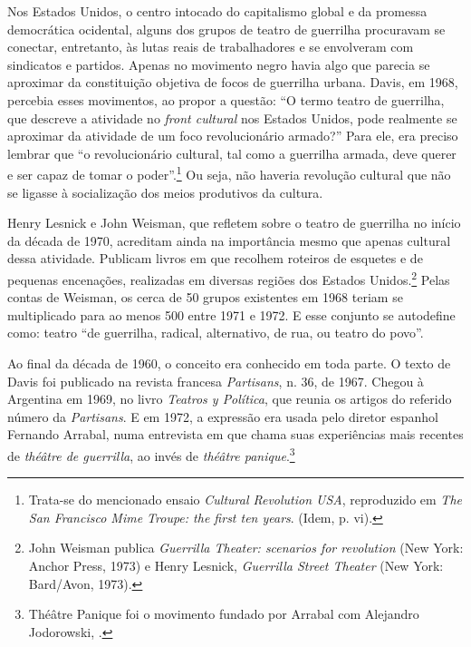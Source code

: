 Nos Estados Unidos, o centro intocado do capitalismo global e da
promessa democrática ocidental, alguns dos grupos de teatro de guerrilha
procuravam se conectar, entretanto, às lutas reais de trabalhadores e se
envolveram com sindicatos e partidos. Apenas no movimento negro havia
algo que parecia se aproximar da constituição objetiva de focos de
guerrilha urbana. Davis, em 1968, percebia esses movimentos, ao propor a
questão: “O termo teatro de guerrilha, que descreve a atividade no
\textit{front cultural} nos Estados Unidos, pode realmente se aproximar da
atividade de um foco revolucionário armado?” Para ele, era preciso
lembrar que “o revolucionário cultural, tal como a guerrilha armada,
deve querer e ser capaz de tomar o poder”.\footnote{Trata-se do
  mencionado ensaio \textit{Cultural Revolution USA}, reproduzido em
  \textit{The San Francisco Mime Troupe: the first ten years}. (Idem, p.
  vi).} Ou seja, não haveria revolução cultural que não se ligasse à
socialização dos meios produtivos da cultura.

Henry Lesnick e John Weisman, que refletem sobre o teatro de guerrilha
no início da década de 1970, acreditam ainda na importância mesmo que
apenas cultural dessa atividade. Publicam livros em que recolhem
roteiros de esquetes e de pequenas encenações, realizadas em diversas
regiões dos Estados Unidos.\footnote{John Weisman publica \textit{Guerrilla
  Theater: scenarios for revolution} (New York: Anchor Press, 1973) e
  Henry Lesnick, \textit{Guerrilla Street Theater} (New York: Bard/Avon,
  1973).} Pelas contas de Weisman, os cerca de 50 grupos existentes em
1968 teriam se multiplicado para ao menos 500 entre 1971 e 1972. E esse
conjunto se autodefine como: teatro “de guerrilha, radical, alternativo,
de rua, ou teatro do povo”.

Ao final da década de 1960, o conceito era conhecido em toda parte. O
texto de Davis foi publicado na revista francesa \textit{Partisans}, n. 36,
de 1967. Chegou à Argentina em 1969, no livro \textit{Teatros y Política},
que reunia os artigos do referido número da \textit{Partisans}. E em 1972,
a expressão era usada pelo diretor espanhol Fernando Arrabal, numa
entrevista em que chama suas experiências mais recentes de \textit{théâtre
de guerrilla}, ao invés de \textit{théâtre panique}.\footnote{Théâtre
  Panique foi o movimento fundado por Arrabal com Alejandro Jodorowski,
  .}

